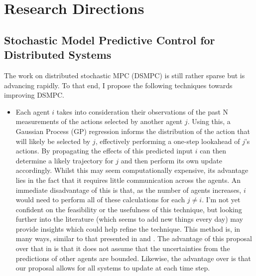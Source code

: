\documentclass[preprint,11pt]{report}
\begin{document}
\chapter{Research Directions}

\section{Stochastic Model Predictive Control for Distributed Systems}

The work on distributed stochastic MPC (DSMPC) is still rather sparse but is advancing rapidly. To
that end, I propose the following techniques towards improving DSMPC.

\begin{itemize}
	\item Each agent $i$ takes into consideration their observations of the past N measurements of the
	actions selected by another agent $j$. Using this, a Gaussian Process (GP) regression informs the
	distribution of the action that will likely be selected by $j$, effectively performing a
	one-step lookahead of $j$'s actions. By propagating the effects of this predicted input $i$ can
	then determine a likely trajectory for $j$ and then perform its own update accordingly. Whilst
	this may seem computationally expensive, its advantage lies in the fact that it requires little
	communication across the agents. An immediate disadvantage of this is that, as the number of
	agents increases, $i$ would need to perform all of these calculations for each $j \neq i$. I'm
	not yet confident on the feasibility or the usefulness of this technique, but looking further
	into the literature (which seems to add new things every day) may provide insights which could
	help refine the technique. This method is, in many ways, similar to that presented in 
	\cite{Conte2014} and \cite{Dai2017}. The advantage of this proposal over that in 
	\cite{Conte2014} is that it does not assume that the uncertainties from the predictions of other
	agents are bounded. Likewise, the advantage over \cite{Dai2017} is that our proposal allows for
	all systems to update at each time step.


\end{itemize}
\end{document}
